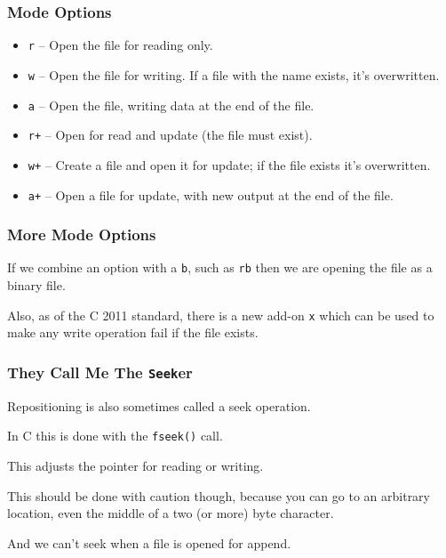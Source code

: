 \begin{frame}
\frametitle{Mode Options}

\begin{itemize}
	\item \texttt{r} -- Open the file for reading only.
	\item \texttt{w} -- Open the file for writing. If a file with the name exists, it's overwritten.
	\item \texttt{a} -- Open the file, writing data at the end of the file.
	\item \texttt{r+} -- Open for read and update (the file must exist).
	\item \texttt{w+} -- Create a file and open it for update; if the file exists it's overwritten.
	\item \texttt{a+} -- Open a file for update, with new output at the end of the file.
\end{itemize}

\end{frame}


\begin{frame}
\frametitle{More Mode Options}

If we combine an option with a \texttt{b}, such as \texttt{rb} then we are opening the file as a binary file. 

Also, as of the C 2011 standard, there is a new add-on \texttt{x} which can be used to make any write operation fail if the file exists.

\end{frame}

\begin{frame}
\frametitle{They Call Me The \texttt{Seek}er}

Repositioning is also sometimes called a seek operation.

In C this is done with the \texttt{fseek()} call. 

This adjusts the pointer for reading or writing. 

This should be done with caution though, because you can go to an arbitrary location, even the middle of a two (or more) byte character. 

And we can't seek when a file is opened for append.

\end{frame}


